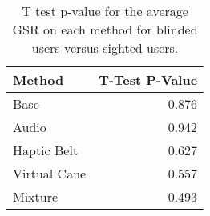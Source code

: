 
\begin{table}[!htb]
\centering
\caption{T test p-value for the average GSR on each method for blinded users versus sighted users.}
\label{tab:ttest_gsr}
\begin{tabular}{lr}
\toprule
      Method &  T-Test P-Value \\
\midrule
        Base &           0.876 \\
       Audio &           0.942 \\
 Haptic Belt &           0.627 \\
Virtual Cane &           0.557 \\
     Mixture &           0.493 \\
\bottomrule
\end{tabular}
\end{table}

